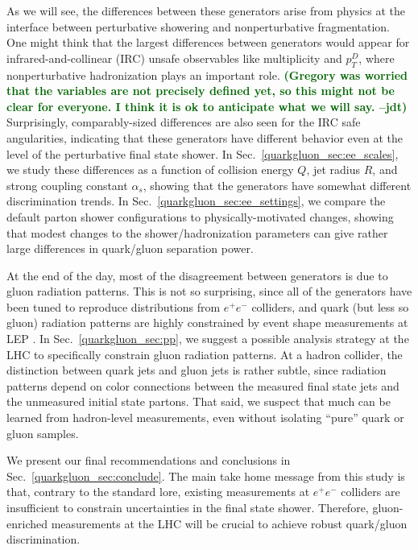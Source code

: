\documentclass[11pt]{cernrep}
\newcommand{\jdt}[1]{\textbf{\textcolor{darkgreen}{(#1 --jdt)}}}
\begin{document}
As we will see, the differences between these generators arise from
physics at the interface between perturbative showering and
nonperturbative fragmentation.  One might think that the largest
differences between generators would appear for infrared-and-collinear
(IRC) unsafe observables like multiplicity and $p_T^D$, where
nonperturbative hadronization plays an important role. \jdt{Gregory was worried that the
  variables are not precisely defined yet, so this might not be clear
  for everyone.  I think it is ok to anticipate what we will say.} Surprisingly, comparably-sized differences are also
seen for the IRC safe angularities, indicating that these generators
have different behavior even at the level of the perturbative final
state shower.  In Sec.~\ref{quarkgluon_sec:ee_scales}, we study these
differences as a function of collision energy $Q$, jet radius $R$,
and strong coupling constant $\alpha_s$, showing that the generators
have somewhat different discrimination trends.  In
Sec.~\ref{quarkgluon_sec:ee_settings}, we compare the default parton
shower configurations to physically-motivated changes, showing that
modest changes to the shower/hadronization parameters can give rather
large differences in quark/gluon separation power.

At the end of the day, most of the disagreement between generators is due to gluon radiation patterns.  This is not so surprising, since all of the generators have been tuned to reproduce distributions from $e^+ e^-$ colliders, and quark (but less so gluon) radiation patterns are highly constrained by event shape measurements at LEP \cite{Heister:2003aj,Abdallah:2003xz,Achard:2004sv,Abbiendi:2004qz}.  In Sec.~\ref{quarkgluon_sec:pp}, we suggest a possible analysis strategy at the LHC to specifically constrain gluon radiation patterns.  At a hadron collider, the distinction between quark jets and gluon jets is rather subtle, since radiation patterns depend on color connections between the measured final state jets and the unmeasured initial state partons.  That said, we suspect that much can be learned from hadron-level measurements, even without isolating ``pure'' quark or gluon samples.

We present our final recommendations and conclusions in
Sec.~\ref{quarkgluon_sec:conclude}.  The main take home message from
this study is that, contrary to the standard lore, existing
measurements at $e^+e^-$ colliders are insufficient to constrain
uncertainties in the final state shower.  Therefore, gluon-enriched
measurements at the LHC will be crucial to achieve robust quark/gluon
discrimination.
\end{document}
